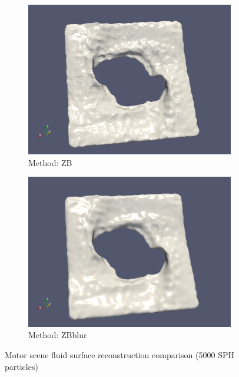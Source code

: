  \begin{figure}
	\begin{center}
        \begin{subfigure}[b]{1\textwidth}
               \includegraphics[width=\textwidth]{figures/ReconstructionMotorSceneZhuBridson.png}
				\caption{Method: ZB}
        \end{subfigure}
       \begin{subfigure}[b]{1\textwidth}
               \includegraphics[width=\textwidth]{figures/ReconstructionMotorSceneZhuBridsonBlur.png}
				\caption{Method: ZBblur}
        \end{subfigure}
        \caption{Motor scene fluid surface reconstruction comparison (5000 SPH particles)}
        \label{fig:MotorScene2}
	\end{center}
\end{figure}
